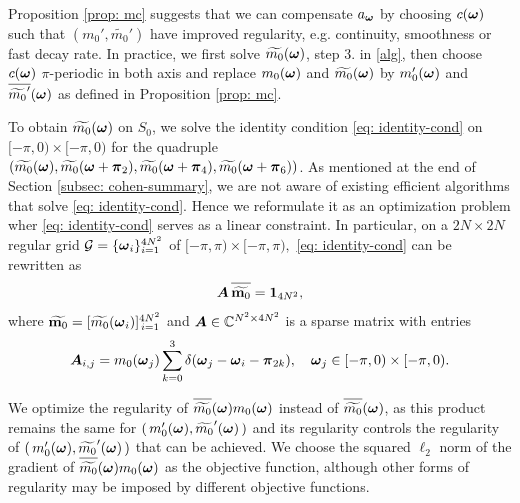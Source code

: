 Proposition \ref{prop: mc} suggests that we can compensate $a_{\boldsymbol{\omega}}$ by choosing $c(\boldsymbol{\omega})$ such that $(m_0',\widetilde{m_0}')$ have improved regularity, e.g. continuity, smoothness or fast decay rate. In practice, we first solve $\widetilde{m_{0}}(\boldsymbol{\omega})$, step 3. in \ref{alg}, then choose $c(\boldsymbol{\omega})$ $\pi$-periodic in both axis and replace $m_0(\boldsymbol{\omega})$ and $\widetilde{m_0}(\boldsymbol{\omega})$ by $m_0'(\boldsymbol{\omega})$ and $\overline{\widetilde{m_0}'}(\boldsymbol{\omega})$ as defined in Proposition \ref{prop: mc}.

To obtain $\widetilde{m_{0}}(\boldsymbol{\omega})$ on $S_0$, we solve the identity condition \eqref{eq: identity-cond} on $[-\pi, 0)\times[-\pi, 0 )$ for the quadruple $(\widetilde{m_{0}}(\boldsymbol{\omega}), \widetilde{m_{0}}(\boldsymbol{\omega}+\boldsymbol{\pi}_{2}), \widetilde{m_{0}}(\boldsymbol{\omega}+\boldsymbol{\pi}_{4}), \widetilde{m_{0}}(\boldsymbol{\omega}+\boldsymbol{\pi}_{6}))$. As mentioned at the end of Section \ref{subsec: cohen-summary}, we are not aware of existing efficient algorithms that solve \eqref{eq: identity-cond}. Hence we reformulate it as an optimization problem wher \eqref{eq: identity-cond} serves as a linear constraint. In particular, on a $2N\times 2N$ regular grid $\mathcal{G}=\{\boldsymbol{\omega}_i\}_{i=1}^{4N^2}$ of $[-\pi, \pi)\times[-\pi, \pi), $ \eqref{eq: identity-cond} can be rewritten as
\begin{align}
\V{A}\, \overlinespace{\widetilde{\mathbf{m}_0}}= \mathbf{1}_{4N^2}, \label{eq: m0-A}%
\end{align}
where $\widetilde{\mathbf{m}_0} = [\widetilde{m_0}(\boldsymbol{\omega}_i)]_{\,i=1}^{4N^2}$ and $\boldsymbol{A}\in \mathbb{C}^{N^2\times 4N^2}$ is a sparse matrix with entries 
$$\boldsymbol{A}_{i,j} = m_0(\boldsymbol{\omega}_j)\sum_{k=0}^3\delta(\boldsymbol{\omega}_j-\boldsymbol{\omega}_i-\boldsymbol{\pi}_{2k}), \quad \boldsymbol{\omega}_j \in [-\pi,0)\times[-\pi,0).$$

We optimize the regularity of $\sbarm{0}m_0(\V{\omega})$ instead of $\sbarm{0}$, as this product remains the same for $(\,m_0'(\boldsymbol{\omega}), \widetilde{m_0}'(\boldsymbol{\omega})\,)$ and its regularity controls the regularity of $(\,m_0'(\boldsymbol{\omega}), \widetilde{m_0}'(\boldsymbol{\omega})\,)$ that can be achieved.
We choose the squared $\ell_2$ norm of the gradient of $\sbarm{0}m_0(\V{\omega})$ as the objective function, although other forms of regularity may be imposed by different objective functions.

